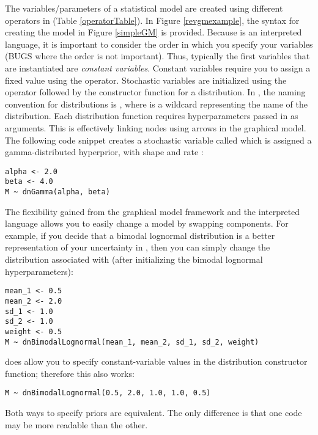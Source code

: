 The variables/parameters of a statistical model are created using different operators in \Rev (Table \ref{operatorTable}). 
In Figure \ref{revgmexample}, the \Rev syntax for creating the model in Figure \ref{simpleGM} is provided.
Because \Rev is an interpreted language, it is important to consider the order in which you specify your variables (\CF BUGS where the order is not important). 
Thus, typically the first variables that are instantiated are \emph{constant variables}. 
Constant variables require you to assign a fixed value using the \cl{<-} operator. 
Stochastic variables are initialized using the \cl{\rbdn} operator followed by the constructor function for a distribution. 
In \Rev, the naming convention for distributions is , where \cl{*} is a wildcard representing the name of the distribution. 
Each distribution function requires hyperparameters passed in as arguments.
This is effectively linking nodes using arrows in the graphical model.
The following code snippet creates a stochastic variable called  which is assigned a gamma-distributed hyperprior, with shape  and rate :
{\tt \begin{snugshade*}
\begin{lstlisting}
alpha <- 2.0
beta <- 4.0
M ~ dnGamma(alpha, beta)
\end{lstlisting}
\end{snugshade*}}

The flexibility gained from the graphical model framework and the interpreted language allows you to easily change a model by swapping components. 
For example, if you decide that a bimodal lognormal distribution is a better representation of your uncertainty in , then you can simply change the distribution associated with  (after initializing the bimodal lognormal hyperparameters):
{\tt \begin{snugshade*}
\begin{lstlisting}
mean_1 <- 0.5
mean_2 <- 2.0
sd_1 <- 1.0
sd_2 <- 1.0
weight <- 0.5
M ~ dnBimodalLognormal(mean_1, mean_2, sd_1, sd_2, weight)
\end{lstlisting}
\end{snugshade*}}

\Rev does allow you to specify constant-variable values in the distribution constructor function; therefore this also works:
{\tt \begin{snugshade*}
\begin{lstlisting}
M ~ dnBimodalLognormal(0.5, 2.0, 1.0, 1.0, 0.5)
\end{lstlisting}
\end{snugshade*}}
Both ways to specify priors are equivalent.
The only difference is that one code may be more readable than the other.




